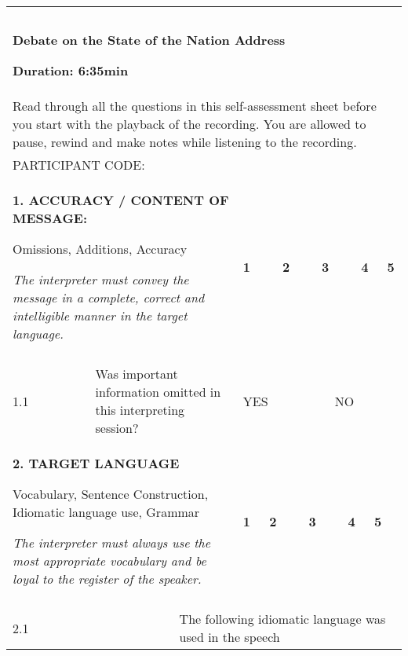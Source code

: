 \documentclass[output=paper]{langsci/langscibook}
\begin{document}
\begin{tabularx}{\textwidth}{XXXXXXXXXXXXXXXXXX}
\lsptoprule

\multicolumn{18}{X}{ \textbf{SELF-ASSESSMENT SHEET}\par

}\\
&  &  &  &  &  &  &  &  &  &  &  &  &  &  &  &  & \\
\multicolumn{18}{X}{\textbf{Debate on the State of the Nation Address} 

\textbf{Duration: 6:35min}}\\
\multicolumn{18}{X}{Read through all the questions in this self-assessment sheet before you start with the playback of the recording. You are allowed to pause, rewind and make notes while listening to the recording.} \\
\multicolumn{2}{X}{PARTICIPANT CODE:}  & \multicolumn{16}{X}{}\\
\multicolumn{6}{X}{\textbf{1. ACCURACY / CONTENT OF MESSAGE:} 

Omissions, Additions, Accuracy

\textit{The interpreter must convey the message in a complete, correct and intelligible manner in the target language.}} & \multicolumn{3}{X}{ \textbf{1}} & \multicolumn{3}{X}{ \textbf{2}} & \multicolumn{3}{X}{ \textbf{3}} & \multicolumn{2}{X}{ \textbf{4}} & \textbf{5}\\
\hhline{~~~~~~------------} &  &  &  &  &  & \multicolumn{3}{X}{} & \multicolumn{3}{X}{} & \multicolumn{3}{X}{} & \multicolumn{2}{X}{} & \\
\multicolumn{1}{X}{1.1} & \multicolumn{5}{X}{Was important information omitted in this interpreting session?} & \multicolumn{7}{X}{ YES} & \multicolumn{5}{X}{ NO}\\
\multicolumn{6}{X}{\textbf{2. TARGET LANGUAGE} 

Vocabulary, Sentence Construction, Idiomatic language use, Grammar

\textit{The interpreter must always use the most appropriate vocabulary and be loyal to the register of the speaker.}} & \multicolumn{2}{X}{ \textbf{1}} & \multicolumn{3}{X}{ \textbf{2}} & \multicolumn{3}{X}{ \textbf{3}} & \multicolumn{2}{X}{ \textbf{4}} & \multicolumn{2}{X}{ \textbf{5}}\\
\hhline{~~~~~~------------} &  &  &  &  &  & \multicolumn{2}{X}{} & \multicolumn{3}{X}{} & \multicolumn{3}{X}{} & \multicolumn{2}{X}{} & \multicolumn{2}{X}{}\\
\multicolumn{3}{X}{2.1} & \multicolumn{15}{X}{The following idiomatic language was used in the speech 

}
\end{tabularx}
\end{document}

